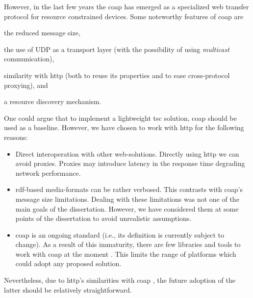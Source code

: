 However, in the last few years the \acf{coap}  has emerged as a specialized web transfer protocol for resource constrained devices. %
Some noteworthy features of \ac{coap} are
\begin{enumerate*}[label=\itshape(\arabic*\upshape)]
  \item the reduced message size,
  \item the use of UDP as a transport layer (with the possibility of using \emph{multicast} communication),
  \item similarity with \ac{http} (both to reuse its properties and to ease cross-protocol proxying), and
  \item a resource discovery mechanism. %
\end{enumerate*}


One could argue that to implement a lightweight \ac{tsc} solution, \ac{coap} should be used as a baseline.
However, we have chosen to work with \ac{http} for the following reasons:
\begin{itemize}
  \item Direct interoperation with other web-solutions.
        Directly using \ac{http} we can avoid proxies.
        Proxies may introduce latency in the response time degrading network performance. %
  \item \ac{rdf}-based media-formats can be rather verbosed.
	This contrasts with \ac{coap}'s message size limitations.
	Dealing with these limitations was not one of the main goals of the dissertation.
	However, we have considered them at some points of the dissertation to avoid unrealistic assumptions.
  \item \ac{coap} is an ongoing standard (i.e., its definition is currently subject to change).
        As a result of this immaturity, there are few libraries and tools to work with \ac{coap} at the moment \citep{villaverde_constrained_2012}. %
        This limits the range of platforms which could adopt any proposed solution. %
\end{itemize}


Nevertheless, due to \ac{http}'s similarities with \ac{coap} \citep{kovatsch_coap_2013}, the future adoption of the latter should be relatively straightforward.


